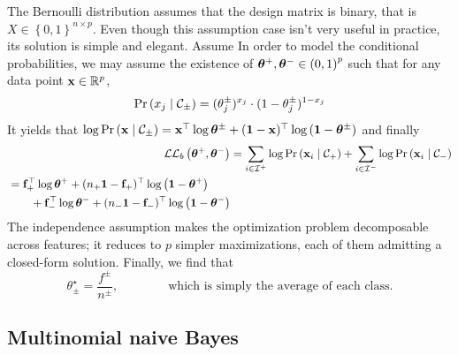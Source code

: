 The Bernoulli distribution assumes that the design matrix is binary,
that is $X \in \left\{ 0, 1 \right\}^{n \times p}$.
Even though this assumption case isn't very useful in practice, its solution is simple and elegant.
Assume
In order to model the conditional probabilities, we may assume the existence of $\bm{\theta}^+, \bm{\theta}^- \in \left( 0, 1 \right)^p$
such that for any data point $\mathbf{x} \in \mathbb{R}^p$,
\[
        \Pr\left( x_j \mid \mathcal{C}_\pm \right) = (\theta^\pm_j)^{x_j} \cdot (1 - \theta^\pm_j)^{1 - x_j}
\]
It yields that $\log \Pr\left( \mathbf{x} \mid \mathcal{C}_\pm \right) =
\mathbf{x}^\top\log\bm{\theta}^\pm + (\mathbf{1} - \mathbf{x})^\top\log\left( \mathbf{1} - \bm{\theta}^\pm \right)$
and finally
\begin{align}\label{eq:bernoulli_snb_ll}
        \mathcal{L}\mathcal{L}_b\left( \bm{\theta}^+, \bm{\theta}^- \right)
        &= \sum_{i \in \mathcal{I}^+} \log \Pr\left( \mathbf{x}_i \mid \mathcal{C}_+ \right)
                + \sum_{i \in \mathcal{I}^-} \log \Pr\left( \mathbf{x}_i \mid \mathcal{C}_- \right)\nonumber\\
        \begin{split}
                &= \mathbf{f}_+^\top\log\bm{\theta}^+ + (n_+\mathbf{1} - \mathbf{f}_+)^\top\log\left( \mathbf{1} - \bm{\theta}^+ \right)\\
                &\qquad+ \mathbf{f}_-^\top\log\bm{\theta}^- + (n_-\mathbf{1} - \mathbf{f}_-)^\top\log\left( \mathbf{1} - \bm{\theta}^- \right)
        \end{split}
\end{align}
The independence assumption makes the optimization problem decomposable across features;
it reduces to $p$ simpler maximizations, each of them admitting a closed-form solution.
Finally, we find that
\begin{equation*}
        \theta_\pm^\star = \frac{f^\pm}{n^\pm}
        ,\qquad\qquad
        \text{which is simply the average of each class.}
\end{equation*}

\subsection{Multinomial naive Bayes}\label{subsec:mnb}

